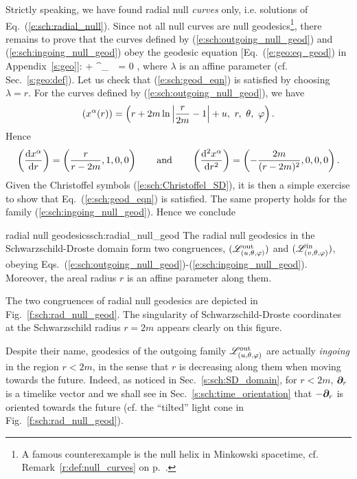Strictly speaking, we have found radial null \emph{curves} only, i.e. solutions of
Eq.~(\ref{e:sch:radial_null}). Since not all null curves
are null geodesics\footnote{A famous counterexample is the null helix in Minkowski
spacetime, cf. Remark~\ref{r:def:null_curves} on p.~\pageref{r:def:null_curves}.}, there remains to prove that the curves defined
by (\ref{e:sch:outgoing_null_geod}) and (\ref{e:sch:ingoing_null_geod})
obey the geodesic equation [Eq.~(\ref{e:geo:eq_geod}) in Appendix~\ref{s:geo}]:
\be \label{e:sch:geod_eqn}
     + \Gamma^\alpha_{\ \, \mu\nu}
          = 0 ,
\ee
where $\lambda$ is an affine parameter (cf. Sec.~\ref{s:geo:def}).
Let us check that (\ref{e:sch:geod_eqn}) is satisfied by choosing $\lambda=r$.
For the curves defined by (\ref{e:sch:outgoing_null_geod}), we have
\[
   \left( x^\alpha(r) \right) = \left( r + 2 m \ln \left| \frac{r}{2m} - 1 \right| + u,\ r,\  \theta,\  \varphi \right) .
\]
Hence
\[
    \left( \frac{\mathrm{d} x^\alpha}{\mathrm{d} r} \right) = \left( \frac{r}{r-2m}, 1, 0, 0 \right)
    \qquad\mbox{and}\qquad
    \left(  \frac{\mathrm{d}^2 x^\alpha}{\mathrm{d} r^2} \right) = \left( - \frac{2m}{(r-2m)^2}, 0, 0, 0 \right) .
\]
Given the Christoffel symbols (\ref{e:sch:Christoffel_SD}), it is then a
simple exercise to show that Eq.~(\ref{e:sch:geod_eqn}) is satisfied.
The same property holds for the family (\ref{e:sch:ingoing_null_geod}). Hence
we conclude
\begin{tprop}{radial null geodesics}{sch:radial_null_geod}
The radial null geodesics in the Schwarzschild-Droste domain
form two congruences, $(\mathscr{L}^{\rm out}_{(u,\theta,\varphi)})$ and $(\mathscr{L}^{\rm in}_{(v,\theta,\varphi)})$,
obeying Eqs.~(\ref{e:sch:outgoing_null_geod})-(\ref{e:sch:ingoing_null_geod}).
Moreover, the areal radius $r$ is an affine parameter along them.
\end{tprop}

The two congruences of radial null geodesics are depicted in
Fig.~\ref{f:sch:rad_null_geod}.
The singularity of Schwarzschild-Droste coordinates at
the Schwarzschild radius $r=2m$
appears clearly on this figure.


\begin{remark} \label{r:sch:outgoing_ingoing}
Despite their name, geodesics of the outgoing family $\mathscr{L}^{\rm out}_{(u,\theta,\varphi)}$ are actually
\emph{ingoing} in the region $r<2m$, in the sense that
$r$ is decreasing along them when moving towards the future. Indeed,
as noticed in Sec.~\ref{s:sch:SD_domain},
for $r<2m$, $\bm{\partial}_r$ is a timelike vector and we shall see in Sec.~\ref{s:sch:time_orientation}
that $-\bm{\partial}_r$ is oriented towards the future (cf. the ``tilted'' light cone
in Fig.~\ref{f:sch:rad_null_geod}).
\end{remark}

